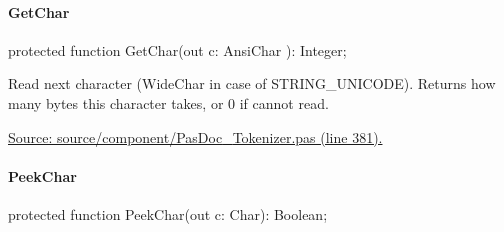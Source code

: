 \documentclass{report}
\newif\ifpdf
\begin{document}
\paragraph*{GetChar}\hspace*{\fill}

\label{PasDoc_Tokenizer.TTokenizer-GetChar}
\begin{list}{}{
\setlength{\itemindent}{0cm}
\setlength{\listparindent}{0cm}
\setlength{\leftmargin}{\evensidemargin}
\addtolength{\leftmargin}{\tmplength}
\settowidth{\labelsep}{X}
\addtolength{\leftmargin}{\labelsep}
\setlength{\labelwidth}{\tmplength}
}
\item[\textbf{Declaration}\hfill]
\ifpdf
\begin{flushleft}
\fi
\begin{ttfamily}
protected function GetChar(out c: AnsiChar ): Integer;\end{ttfamily}

\ifpdf
\end{flushleft}
\fi

\par
\item[\textbf{Description}]
Read next character (WideChar in case of STRING{\_}UNICODE). Returns how many bytes this character takes, or 0 if cannot read.\par
\href{https://github.com/pasdoc/pasdoc/blob/master/source/component/PasDoc_Tokenizer.pas#L381}{Source: source/component/PasDoc{\_}Tokenizer.pas (line 381).}

\end{list}
\paragraph*{PeekChar}\hspace*{\fill}

\label{PasDoc_Tokenizer.TTokenizer-PeekChar}
\begin{list}{}{
\setlength{\itemindent}{0cm}
\setlength{\listparindent}{0cm}
\setlength{\leftmargin}{\evensidemargin}
\addtolength{\leftmargin}{\tmplength}
\settowidth{\labelsep}{X}
\addtolength{\leftmargin}{\labelsep}
\setlength{\labelwidth}{\tmplength}
}
\item[\textbf{Declaration}\hfill]
\ifpdf
\begin{flushleft}
\fi
\begin{ttfamily}
protected function PeekChar(out c: Char): Boolean;\end{ttfamily}

\ifpdf
\end{flushleft}
\fi

\end{list}
\end{document}
